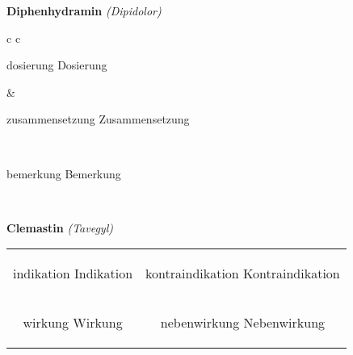 \documentclass[12pt]{beamer}
\begin{document}
\begin{frame}{
    \textbf{Diphenhydramin}
    \textit{(Dipidolor)}
}
    \begin{tabular}{c c}
        \begin{beamercolorbox}[wd=\boxwidth\textwidth,ht=\boxheight\textheight,sep=1em]{dosierung}
        Dosierung
        \end{beamercolorbox} & 
        \begin{beamercolorbox}[wd=\boxwidth\textwidth,ht=\boxheight\textheight,sep=1em]{zusammensetzung}
        Zusammensetzung
        \end{beamercolorbox} \\
        \begin{beamercolorbox}[wd=\textwidth,ht=\boxheight\textheight,sep=1em]{bemerkung}
        Bemerkung
        \end{beamercolorbox} \\
    \end{tabular}
\end{frame}

\begin{frame}{
    \textbf{Clemastin}
    \textit{(Tavegyl)}
}
    \begin{tabular}{c c}
        \begin{beamercolorbox}[wd=\boxwidth\textwidth,ht=\boxheight\textheight,sep=1em]{indikation}
        Indikation
        \end{beamercolorbox} & 
        \begin{beamercolorbox}[wd=\boxwidth\textwidth,ht=\boxheight\textheight,sep=1em]{kontraindikation}
        Kontraindikation 
        \end{beamercolorbox} \\
        \begin{beamercolorbox}[wd=\boxwidth\textwidth,ht=\boxheight\textheight,sep=1em]{wirkung}
        Wirkung
        \end{beamercolorbox} & 
        \begin{beamercolorbox}[wd=\boxwidth\textwidth,ht=\boxheight\textheight,sep=1em]{nebenwirkung}
        Nebenwirkung
        \end{beamercolorbox} \\
    \end{tabular}
\end{frame}
\end{document}
